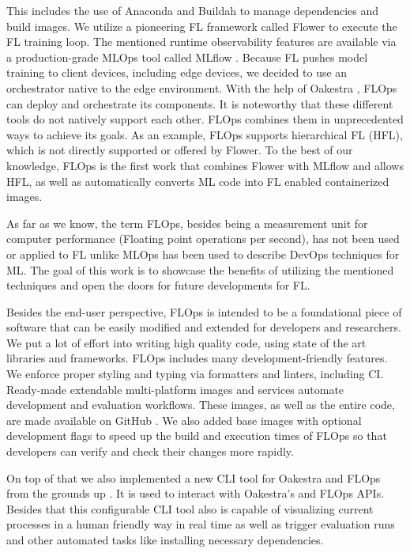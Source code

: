 This includes the use of Anaconda \cite{anaconda_docs} and Buildah \cite{buildah_homepage}
to manage dependencies and build images.
We utilize a pioneering FL framework called Flower \cite{flower_docs} to execute the FL training loop.
The mentioned runtime observability features are available via a production-grade MLOps tool called MLflow \cite{mlflow_docs}.
Because FL pushes model training to client devices, including edge devices,
we decided to use an orchestrator native to the edge environment.
With the help of Oakestra \cite{paper:oakestra_usenix}, FLOps can deploy and orchestrate its components.
It is noteworthy that these different tools do not natively support each other.
FLOps combines them in unprecedented ways to achieve its goals.
As an example, FLOps supports hierarchical FL (HFL), which is not directly supported or offered by Flower.
To the best of our knowledge, FLOps is the first work that combines Flower with MLflow and allows HFL,
as well as automatically converts ML code into FL enabled containerized images.

As far as we know, the term FLOps, besides being a measurement unit for computer performance (Floating point operations per second),
has not been used or applied to FL unlike MLOps has been used to describe DevOps techniques for ML.
The goal of this work is to showcase the benefits of utilizing the mentioned techniques and
open the doors for future developments for FL.


Besides the end-user perspective, FLOps is intended to be a foundational piece of software
that can be easily modified and extended for developers and researchers.
We put a lot of effort into writing high quality code, using state of the art libraries and frameworks.
FLOps includes many development-friendly features.
We enforce proper styling and typing via formatters and linters, including CI.
Ready-made extendable multi-platform images and services automate development and evaluation workflows.
These images, as well as the entire code, are made available on GitHub \cite{flops_code}.
We also added base images with optional development flags to speed up the build and execution times of FLOps
so that developers can verify and check their changes more rapidly.

On top of that we also implemented a new CLI tool for Oakestra and FLOps from the grounds up \cite{cli_code}.
It is used to interact with Oakestra's and FLOps APIs.
Besides that this configurable CLI tool also is capable of visualizing 
current processes in a human friendly way in real time as well as trigger evaluation runs and
other automated tasks like installing necessary dependencies.